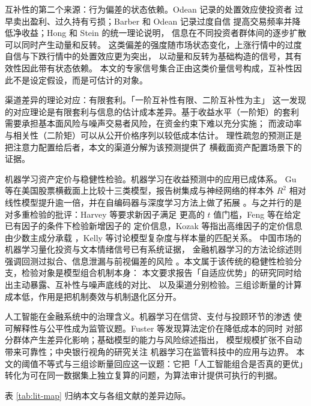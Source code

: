 互补性的第二个来源：行为偏差的状态依赖。Odean 记录的处置效应使投资者
过早卖出盈利、过久持有亏损\cite{odean1998}；Barber 和 Odean 记录过度自信
提高交易频率并降低净收益\cite{barberodean2001}；Hong 和 Stein 的统一理论说明，
信息在不同投资者群体间的逐步扩散可以同时产生动量和反转\cite{hongstein1999}。
这类偏差的强度随市场状态变化，上涨行情中的过度自信与下跌行情中的处置效应更为突出，
以动量和反转为基础构造的信号，其有效性因此带有状态依赖。
本文的专家信号集合正由这类价量信号构成，互补性因此不是设定假设，而是可估计的对象。

渠道差异的理论对应：有限套利。「一阶互补性有限、二阶互补性为主」
这一发现的对应理论是有限套利与信息的估计成本差异。基于收益水平（一阶矩）的套利
需要承担基本面风险与噪声交易者风险，在资金约束下难以充分实施\cite{shleifer1997}；
而波动率与相关性（二阶矩）可以从公开价格序列以较低成本估计。
理性疏忽的预测正是把注意力配置给后者，本文的渠道分解为该预测提供了
横截面资产配置场景下的证据。

机器学习资产定价与稳健性检验。机器学习在收益预测中的应用已成体系。
Gu 等在美国股票横截面上比较十三类模型，报告树集成与神经网络的样本外 $R^2$
相对线性模型提升逾一倍\cite{gu2020}，并在自编码器与深度学习方法上做了拓展
\cite{gu2021,chen2024}。与之并行的是对多重检验的批评：Harvey 等要求新因子满足
更高的 $t$ 值门槛\cite{harvey2016}，Feng 等在给定已有因子的条件下检验新增因子的
定价信息\cite{feng2020}，Kozak 等指出高维因子的定价信息由少数主成分承载
\cite{kozak2020}，Kelly 等讨论模型复杂度与样本量的匹配关系\cite{kelly2024,kelly2023}。
中国市场的机器学习量化投资与文本情绪信号已有系统证据\cite{libin2019,jiang2021,shen2019}，
金融机器学习的方法论综述则强调回测过拟合、信息泄漏与前视偏差的风险
\cite{lopezdeprado2018}。本文属于该传统的稳健性检验分支，检验对象是模型组合机制本身：
本文要求报告「自适应优势」的研究同时给出主动暴露、互补性与噪声底线的对比、
以及渠道分别检验。三组诊断量的计算成本低，作用是把机制奏效与机制退化区分开。

人工智能在金融系统中的治理含义。机器学习在信贷、支付与投顾环节的渗透
使可解释性与公平性成为监管议题。Fuster 等发现算法定价在降低成本的同时
对部分群体产生差异化影响\cite{fuster2022}；基础模型的能力与风险综述指出，
模型规模扩张不自动带来可靠性\cite{bommasani2021}；中央银行视角的研究关注
机器学习在监管科技中的应用与边界\cite{chakraborty2017,bis2024aer}。
本文的阈值不等式与三组诊断量回应这一议题：它把「人工智能组合是否真的更优」
转化为可在同一数据集上独立复算的问题，为算法审计提供可执行的判据。

表 \ref{tab:lit-map} 归纳本文与各组文献的差异边际。


